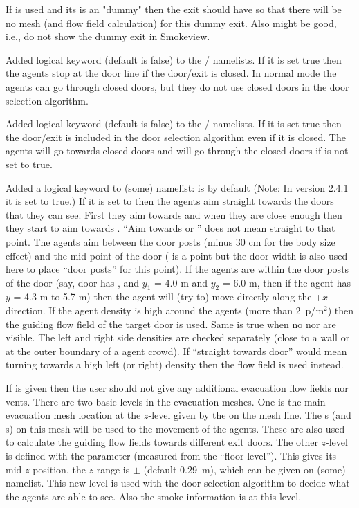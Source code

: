 \documentclass[12pt,a4paper,final,twoside]{stylevk}
\begin{document}
If  is used and its  is an "dummy"
 then the exit should have  so
that there will be no mesh (and flow field calculation) for this dummy
exit.  Also  might be good, i.e., do not show the
dummy exit in Smokeview.

Added logical keyword  (default is false)
to the / namelists.  If it is set true then
the agents stop at the door line if the door/exit is closed.  In
normal mode the agents can go through closed doors, but they do not
use closed doors in the door selection algorithm.

Added logical keyword  (default is false)
to the / namelists.  If it is set true then
the door/exit is included in the door selection algorithm even if it
is closed.  The agents will go towards closed doors and will go
through the closed doors if  is not set to
true.

Added a logical keyword to (some)  namelist:
 is by default   (Note: In version
2.4.1 it is set to true.)  If it is set to   then the
agents aim straight towards the doors that they can see.  First they
aim towards  and when they are close enough then they start
to aim towards .  ``Aim towards  or ''
does not mean straight to that point.  The agents aim between the door
posts (minus 30 cm for the body size effect) and the mid point of the
door ( is a point but the door width is also used here to
place ``door posts'' for this point).  If the agents are within the door
posts of the door (say, door has , and $y_1$ = 4.0 m and
$y_2$ = 6.0 m, then if the agent has $y$ = 4.3 m to 5.7 m) then the
agent will (try to) move directly along the +$x$ direction.  If the
agent density is high around the agents (more than 2~p/$\textrm{m}^2$)
then the guiding flow field of the target door is used.  Same is true
when no  nor  are visible.  The left and right
side densities are checked separately (close to a wall or at the outer
boundary of a agent crowd).  If ``straight towards door'' would mean
turning towards a high left (or right) density then the flow field is
used instead.

If  is given then the user should not give
any additional evacuation flow fields nor vents.  There are two basic
levels in the evacuation meshes.  One is the main evacuation mesh
location at the $z$-level given by the  on the mesh line.
The s (and s) on this mesh will be used to the
movement of the agents.  These are also used to calculate the guiding
flow fields towards different exit doors.  The other $z$-level is
defined with the  parameter (measured from
the ``floor level'').  This gives its mid $z$-position, the $z$-range
is $\pm$ (default 0.29~m), which can be given
on (some)  namelist.  This new level is used with the door
selection algorithm to decide what the agents are able to see.  Also
the smoke information is at this level.
\end{document}
